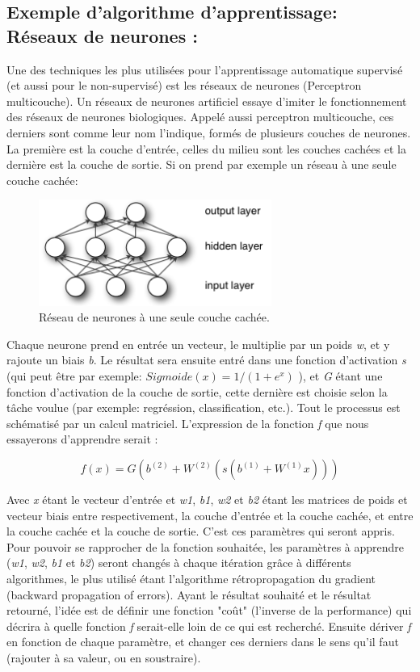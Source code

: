 \subsection{Exemple d'algorithme d'apprentissage: Réseaux de neurones :}
Une des techniques les plus utilisées pour l'apprentissage automatique supervisé (et aussi pour le non-supervisé) est les réseaux de neurones (Perceptron multicouche). 
Un réseaux de neurones artificiel essaye d'imiter le fonctionnement des réseaux de neurones biologiques. Appelé aussi perceptron multicouche, ces derniers sont comme leur nom l'indique, formés de plusieurs couches de neurones. La première est la couche d'entrée, celles du milieu sont les couches cachées et la dernière est la couche de sortie.
Si on prend par exemple un réseau à une seule couche cachée:


\begin{figure}[H]
	\centering
		\includegraphics[width=3in]{Figures/mlp.png}
	\caption[An Electron]{Réseau de neurones à une seule couche cachée.}
	\label{fig:Electron}
\end{figure}

Chaque neurone prend en entrée un vecteur, le multiplie par un poids \textit{w}, et y rajoute un biais \textit{b}. Le résultat sera ensuite entré dans une fonction d'activation \textit{s} (qui peut être par exemple: $Sigmoide(x) = 1/(1+e^{x})$ ), et \textit{G} étant une fonction d'activation de la couche de sortie, cette dernière est choisie selon la tâche voulue (par exemple: regréssion, classification, etc.).
Tout le processus est schématisé par un calcul matriciel. L’expression de la fonction \textit{f} que nous essayerons d'apprendre serait :

$$f(x) = G( b^{(2)} + W^{(2)}( s( b^{(1)} + W^{(1)} x)))$$

Avec \textit{x} étant le vecteur d'entrée et \textit{w1}, \textit{ b1}, \textit{w2} et \textit{b2} étant les matrices de poids et vecteur biais entre respectivement, la couche d'entrée et la couche cachée, et entre la couche cachée et la couche de sortie. C'est ces paramètres qui seront appris.
Pour pouvoir se rapprocher de la fonction souhaitée, les paramètres à apprendre (\textit{w1}, \textit{ w2}, \textit{b1} et \textit{b2}) seront changés à chaque itération grâce à différents algorithmes, le plus utilisé étant l'algorithme rétropropagation du gradient (backward propagation of errors). 
Ayant le résultat souhaité et le résultat retourné, l'idée est de définir une fonction "coût" (l'inverse de la performance) qui décrira à quelle fonction \textit{f} serait-elle loin de ce qui est recherché. Ensuite dériver \textit{f} en fonction de chaque paramètre, et changer ces derniers dans le sens qu'il faut (rajouter à sa valeur, ou en soustraire).

